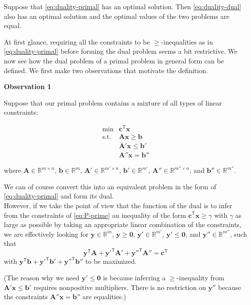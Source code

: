 \documentclass[]{book}
\newcommand{\RR}{\mathbb{R}}
\newcommand{\T}{\mathsf{T}}
\newcommand{\mm}[1]{\mathbf{#1}}
\renewcommand{\vec}[1]{\mathbf{#1}}
\theoremstyle{definition}
\theoremstyle{definition}
\theoremstyle{remark}
\let\BeginKnitrBlock\begin \let\EndKnitrBlock\end
\begin{document}
\BeginKnitrBlock{theorem}
\protect\hypertarget{thm:strong-duality-special}{}{\label{thm:strong-duality-special}}
Suppose that \eqref{eq:duality-primal} has an optimal solution. Then
\eqref{eq:duality-dual} also has an optimal solution and the optimal
values of the two problems are equal.
\EndKnitrBlock{theorem}

At first glance, requiring all the constraints to be
\(\geq\)-inequalities as in \eqref{eq:duality-primal} before forming the
dual problem seems a bit restrictive. We now see how the dual problem of
a primal problem in general form can be defined. We first make two
observations that motivate the definition.

\textbf{Observation 1}

Suppose that our primal problem contains a mixture of all types of
linear constraints:

\begin{equation}
\begin{array}{rl}
\min & \vec{c}^\T\vec{x}  \\
\mbox{s.t.} & \mm{A}\vec{x}\geq \vec{b} \\
& \mm{A'}\vec{x} \leq \vec{b'} \\
& \mm{A''}\vec{x} = \vec{b''}
\end{array} \label{eq:P-prime}
\end{equation}

where \(\mm{A} \in \RR^{m\times n}\), \(\vec{b} \in \RR^{m}\),
\(\mm{A}' \in \RR^{m'\times n}\), \(\vec{b}' \in \RR^{m'}\),
\(\mm{A}'' \in \RR^{m''\times n}\), and \(\vec{b}'' \in \RR^{m''}\).

We can of course convert this into an equivalent problem in the form of
\eqref{eq:duality-primal} and form its dual.\\
However, if we take the point of view that the function of the dual is
to infer from the constraints of \eqref{eq:P-prime} an inequality of the
form \(\vec{c}^\T \vec{x} \geq \gamma\) with \(\gamma\) as large as
possible by taking an appropriate linear combination of the constraints,
we are effectively looking for \(\vec{y} \in \RR^{m}\),
\(\vec{y} \geq \vec{0}\), \(\vec{y}' \in \RR^{m'}\),
\(\vec{y}' \leq \vec{0}\), and \(\vec{y}'' \in \RR^{m''}\), such that
\[\vec{y}^\T\mm{A}
+\vec{y'}^\T\mm{A'}
+\vec{y''}^\T\mm{A''} = \vec{c}^\T\] with
\(\vec{y}^\T\vec{b} +\vec{y'}^\T\vec{b'} +\vec{y''}^\T\vec{b''}\) to be
maximized.

(The reason why we need \(\vec{y'} \leq \vec{0}\) is because inferring a
\(\geq\)-inequality from \(\mm{A}'\vec{x} \leq \vec{b}'\) requires
nonpositive multipliers. There is no restriction on \(\vec{y''}\)
because the constraints \(\mm{A}''\vec{x} = \vec{b}''\) are equalities.)
\end{document}
